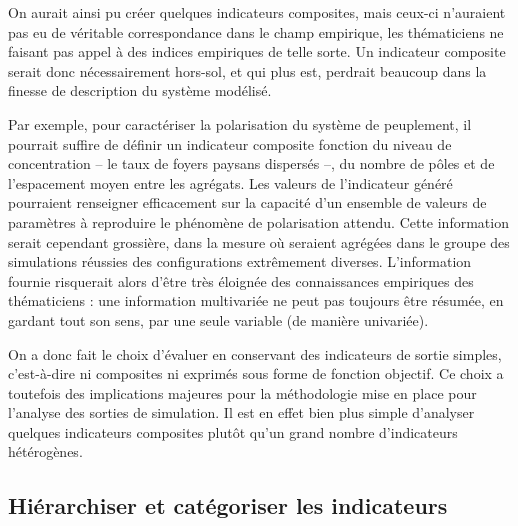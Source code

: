 On aurait ainsi pu créer quelques indicateurs composites, mais ceux-ci n'auraient pas eu de véritable correspondance dans le champ empirique, les thématiciens ne faisant pas appel à des indices empiriques de telle sorte.
Un indicateur composite serait donc nécessairement \og hors-sol\fg{}, et qui plus est, perdrait beaucoup dans la finesse de description du système modélisé.

Par exemple, pour caractériser la polarisation du système de peuplement, il pourrait suffire de définir un indicateur composite fonction du niveau de concentration -- le taux de foyers paysans dispersés --, du nombre de pôles et de l'espacement moyen entre les agrégats.
Les valeurs de l'indicateur généré pourraient renseigner efficacement sur la capacité d'un ensemble de valeurs de paramètres à reproduire le phénomène de polarisation attendu.
Cette information serait cependant grossière, dans la mesure où seraient agrégées dans le groupe des \og simulations réussies\fg{} des configurations extrêmement diverses.
L'information fournie risquerait alors d'être très éloignée des connaissances empiriques des thématiciens :
une information multivariée ne peut pas toujours être résumée, en gardant tout son sens, par une seule variable (de manière univariée).

On a donc fait le choix d'évaluer \simfeodal{} en conservant des indicateurs de sortie \og simples\fg{}, c'est-à-dire ni composites ni exprimés sous forme de fonction objectif.
Ce choix a toutefois des implications majeures pour la méthodologie mise en place pour l'analyse des sorties de simulation.
Il est en effet bien plus simple d'analyser quelques indicateurs composites plutôt qu'un grand nombre d'indicateurs hétérogènes.

\subsection{Hiérarchiser et catégoriser les indicateurs \label{subsec:hierarchiser-indicateurs}}

